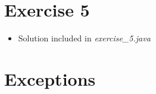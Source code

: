 \documentclass[12pt]{article}
\begin{document}
\bigskip

\section{Exercise 5}

\bigskip

\begin{itemize}
    \item Solution included in \textit{exercise\_5.java}
\end{itemize}

\bigskip

\section{Exceptions}

\bigskip
\end{document}
